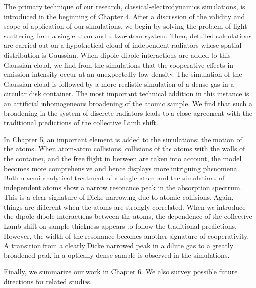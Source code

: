 The primary technique of our research, classical-electrodynamics simulations, is introduced in the beginning of Chapter 4. After a discussion of the validity and scope of application of our simulations, we begin by solving the problem of light scattering from a single atom and a two-atom system. Then, detailed calculations are carried out on a hypothetical cloud of independent radiators whose spatial distribution is Gaussian.  When dipole-dipole interactions are added to this Gaussian cloud, we find from the simulations that the cooperative effects in emission intensity occur at an unexpectedly low density. The simulation of the Gaussian cloud is followed by a more realistic simulation of a dense gas in a circular disk container. The most important technical addition in this instance is an artificial inhomogeneous broadening of the atomic sample. We find that such a broadening in the system of discrete radiators leads to a close agreement with the traditional predictions of the collective Lamb shift.

In Chapter 5, an important element is added to the simulations: the motion of the atoms. When atom-atom collisions, collisions of the atoms with the walls of the container,  and the free flight in between are taken into account, the model becomes more comprehensive and hence displays more intriguing phenomena. Both a semi-analytical treatment of a single atom and the simulations of independent atoms show a narrow resonance peak in the absorption spectrum. This is a clear signature of Dicke narrowing due to atomic collisions. Again, things are different when the atoms are strongly correlated. When we introduce the dipole-dipole interactions between the atoms, the dependence of the collective Lamb shift on sample thickness appears to follow the traditional predictions. However, the width of the resonance becomes another signature of cooperativity.  A transition from a clearly Dicke narrowed peak in a dilute gas to a greatly broadened peak in a optically dense sample is observed in the simulations.

Finally, we summarize our work in Chapter 6. We also survey possible future directions for related studies.